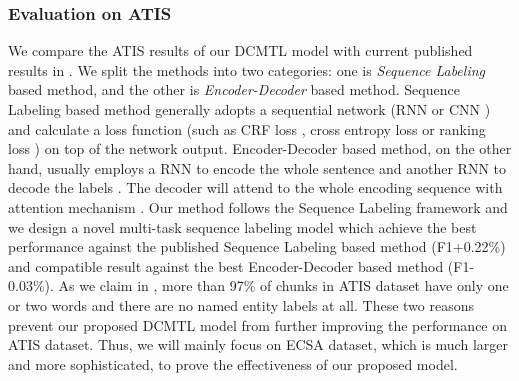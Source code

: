 \subsubsection{Evaluation on ATIS}
We compare the ATIS results of our DCMTL model with current published results in .
We split the methods into two categories:
one is \emph{Sequence Labeling} based method, and the other is \emph{Encoder-Decoder} based method.
Sequence Labeling based method generally adopts a sequential network
(RNN \cite{yao2013recurrent,yao2014spoken,liu2015recurrent,peng2015recurrent,vu2016bi} or CNN \cite{xu2013convolutional,vu2016sequential})
and calculate a loss function (such as CRF loss \cite{xu2013convolutional}, cross entropy loss \cite{yao2013recurrent,yao2014spoken} or ranking loss \cite{vu2016bi}) on top of the network output.
Encoder-Decoder based method, on the other hand, 
usually employs a RNN to encode the whole sentence 
and another RNN to decode the labels \cite{kurata2016leveraging}.
The decoder will attend to the whole encoding sequence with attention mechanism \cite{zhu2017encoder,zhai2017neural}.
Our method follows the Sequence Labeling framework 
and we design a novel multi-task sequence labeling model
which achieve the best performance against the published Sequence Labeling based method (F1+0.22\%)
and compatible result against the best Encoder-Decoder based method (F1-0.03\%).
As we claim in , 
more than 97\% of chunks in ATIS dataset have only one or two words and there are no named entity labels at all.
These two reasons prevent our proposed DCMTL model from further improving the performance on ATIS dataset.
Thus, we will mainly focus on ECSA dataset, 
which is much larger and more sophisticated,
to prove the effectiveness of our proposed model.


